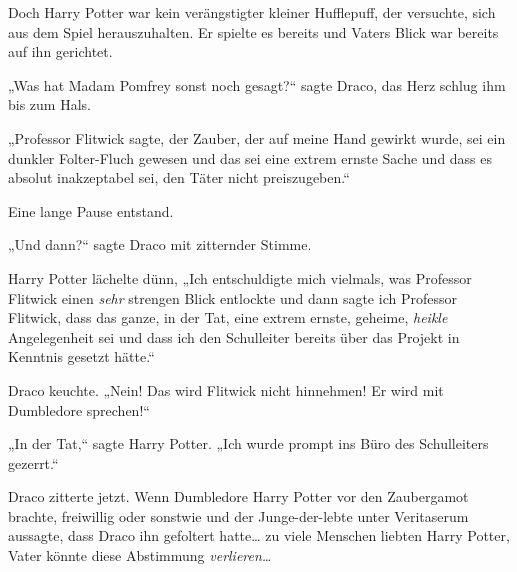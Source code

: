 Doch Harry Potter war kein verängstigter kleiner Hufflepuff, der versuchte, sich aus dem Spiel herauszuhalten. Er spielte es bereits und Vaters Blick war bereits auf ihn gerichtet.

„Was hat Madam Pomfrey sonst noch gesagt?“ sagte Draco, das Herz schlug ihm bis zum Hals.

„Professor Flitwick sagte, der Zauber, der auf meine Hand gewirkt wurde, sei ein dunkler Folter-Fluch gewesen und das sei eine extrem ernste Sache und dass es absolut inakzeptabel sei, den Täter nicht preiszugeben.“

Eine lange Pause entstand.

„Und dann?“ sagte Draco mit zitternder Stimme.

Harry Potter lächelte dünn, „Ich entschuldigte mich vielmals, was Professor Flitwick einen \emph{sehr} strengen Blick entlockte und dann sagte ich Professor Flitwick, dass das ganze, in der Tat, eine extrem ernste, geheime, \emph{heikle} Angelegenheit sei und dass ich den Schulleiter bereits über das Projekt in Kenntnis gesetzt hätte.“

Draco keuchte. „Nein! Das wird Flitwick nicht hinnehmen! Er wird mit Dumbledore sprechen!“

„In der Tat,“ sagte Harry Potter. „Ich wurde prompt ins Büro des Schulleiters gezerrt.“

Draco zitterte jetzt. Wenn Dumbledore Harry Potter vor den Zaubergamot brachte, freiwillig oder sonstwie und der Junge-der-lebte unter Veritaserum aussagte, dass Draco ihn gefoltert hatte… zu viele Menschen liebten Harry Potter, Vater könnte diese Abstimmung \emph{verlieren…}

